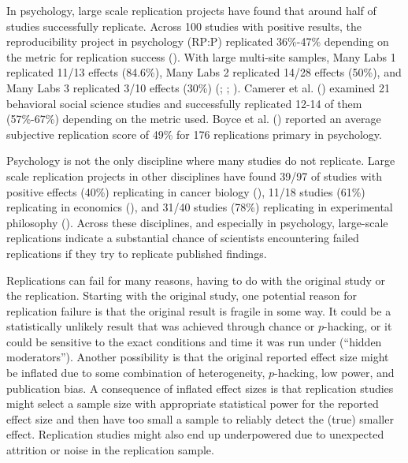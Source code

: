 \documentclass[
  english,
  a4paper,
]{article}
\begin{document}
In psychology, large scale replication projects have found that around half of studies successfully replicate.
Across 100 studies with positive results, the reproducibility project in psychology (RP:P) replicated 36\%-47\% depending on the metric for replication success ().
With large multi-site samples, Many Labs 1 replicated 11/13 effects (84.6\%), Many Labs 2 replicated 14/28 effects (50\%), and Many Labs 3 replicated 3/10 effects (30\%) (; ; ).
Camerer et al. () examined 21 behavioral social science studies and successfully replicated 12-14 of them (57\%-67\%) depending on the metric used.
Boyce et al. () reported an average subjective replication score of 49\% for 176 replications primary in psychology.

Psychology is not the only discipline where many studies do not replicate.
Large scale replication projects in other disciplines have found 39/97 of studies with positive effects (40\%) replicating in cancer biology (), 11/18 studies (61\%) replicating in economics (), and 31/40 studies (78\%) replicating in experimental philosophy ().
Across these disciplines, and especially in psychology, large-scale replications indicate a substantial chance of scientists encountering failed replications if they try to replicate published findings.

Replications can fail for many reasons, having to do with the original study or the replication.
Starting with the original study, one potential reason for replication failure is that the original result is fragile in some way.
It could be a statistically unlikely result that was achieved through chance or \(p\)-hacking, or it could be sensitive to the exact conditions and time it was run under (``hidden moderators'').
Another possibility is that the original reported effect size might be inflated due to some combination of heterogeneity, \(p\)-hacking, low power, and publication bias.
A consequence of inflated effect sizes is that replication studies might select a sample size with appropriate statistical power for the reported effect size and then have too small a sample to reliably detect the (true) smaller effect.
Replication studies might also end up underpowered due to unexpected attrition or noise in the replication sample.
\end{document}
